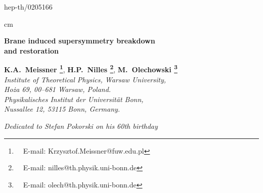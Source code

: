 \documentclass[a4paper,12pt]{article}
\def\ZZ{\mathbb Z}
\begin{document}
\begin{flushright}
hep-th/0205166
\end{flushright}

 cm
\begin{center}
{\Large {\bf Brane induced supersymmetry breakdown 
\\[12pt]
and restoration}} 

\vspace{12mm}
{\large
{\bf K.A.\ Meissner \coordHE{}\footnote{
\ \ E-mail: Krzysztof.Meissner@fuw.edu.pl}}, 
{\bf H.P.\ Nilles \coordHE{}\footnote{
\ \ E-mail: nilles@th.physik.uni-bonn.de}},
{\bf M.\ Olechowski \coordHE{}\footnote{
\ \ E-mail: olech@th.physik.uni-bonn.de}
}}\\
\vspace{4mm}
{\it {}\coordHE{} Institute of Theoretical Physics, Warsaw University,} \\
{\it Ho\.za 69, 00--681 Warsaw, Poland.}\\
\vspace{4mm}
{\it {}\coordHE{} Physikalisches Institut der Universit\"at Bonn,} \\
{\it Nussallee 12, 53115 Bonn, Germany.}\\
\end{center}


\begin{center}
\vspace{10mm}
{\sl Dedicated to Stefan Pokorski on his 60th birthday}
\end{center}

\vspace{10mm}
\begin{abstract}
We investigate the phenomenon of brane induced supersymmetry breakdown
on orbifolds in the presence of a Scherk--Schwarz mechanism. General
consistency conditions are derived for arbitrary dimensions and the
results are illustrated in the specific example of a 5--dimensional
theory compactified on \myHighlight{$S^1/\ZZ_2$}\coordHE{}. This includes a discussion of the
Kaluza--Klein spectrum and the possibility of a brane induced
supersymmetry restoration.
\end{abstract}

\newpage
\end{document}
